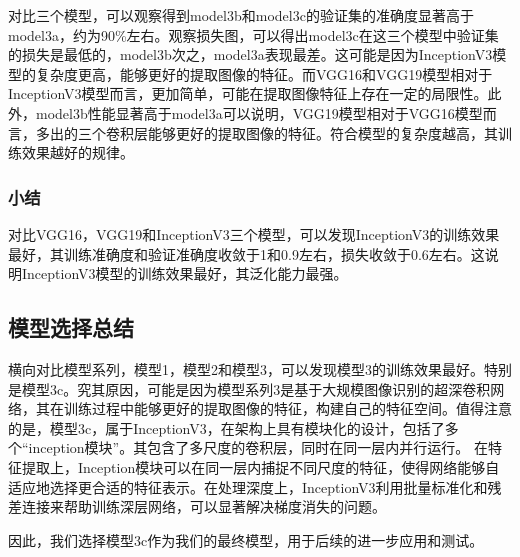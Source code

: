 对比三个模型，可以观察得到model3b和model3c的验证集的准确度显著高于model3a，约为90\%左右。观察损失图，可以得出model3c在这三个模型中验证集的损失是最低的，model3b次之，model3a表现最差。这可能是因为InceptionV3模型的复杂度更高，能够更好的提取图像的特征。而VGG16和VGG19模型相对于InceptionV3模型而言，更加简单，可能在提取图像特征上存在一定的局限性。此外，model3b性能显著高于model3a可以说明，VGG19模型相对于VGG16模型而言，多出的三个卷积层能够更好的提取图像的特征。符合模型的复杂度越高，其训练效果越好的规律。

\subsubsection{小结}

对比VGG16，VGG19和InceptionV3三个模型，可以发现InceptionV3的训练效果最好，其训练准确度和验证准确度收敛于1和0.9左右，损失收敛于0.6左右。这说明InceptionV3模型的训练效果最好，其泛化能力最强。

\subsection{模型选择总结}
横向对比模型系列，模型1，模型2和模型3，可以发现模型3的训练效果最好。特别是模型3c。究其原因，可能是因为模型系列3是基于大规模图像识别的超深卷积网络，其在训练过程中能够更好的提取图像的特征，构建自己的特征空间。值得注意的是，模型3c，属于InceptionV3，在架构上具有模块化的设计，包括了多个“inception模块”。其包含了多尺度的卷积层，同时在同一层内并行运行。
在特征提取上，Inception模块可以在同一层内捕捉不同尺度的特征，使得网络能够自适应地选择更合适的特征表示。在处理深度上，InceptionV3利用批量标准化和残差连接来帮助训练深层网络，可以显著解决梯度消失的问题。

因此，我们选择模型3c作为我们的最终模型，用于后续的进一步应用和测试。

